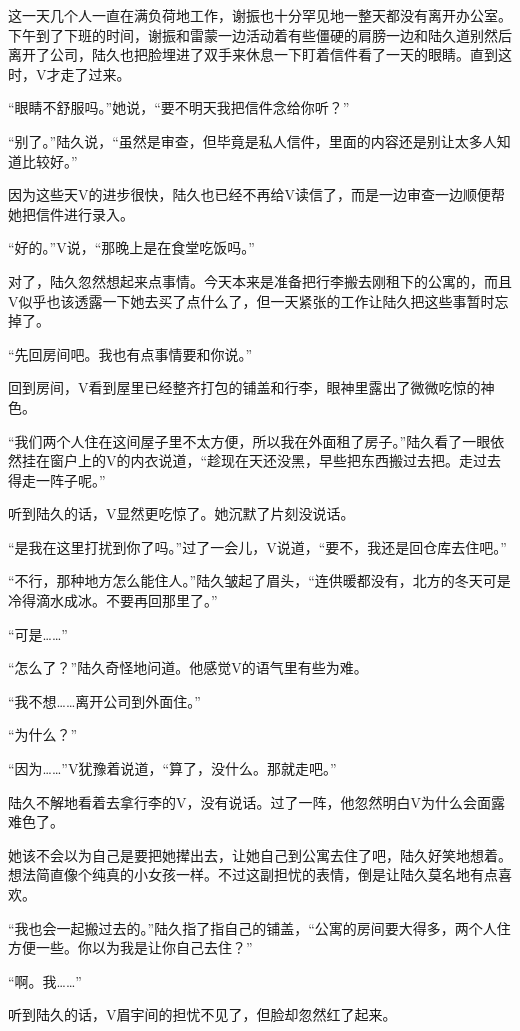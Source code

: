 这一天几个人一直在满负荷地工作，谢振也十分罕见地一整天都没有离开办公室。下午到了下班的时间，谢振和雷蒙一边活动着有些僵硬的肩膀一边和陆久道别然后离开了公司，陆久也把脸埋进了双手来休息一下盯着信件看了一天的眼睛。直到这时，V才走了过来。

“眼睛不舒服吗。”她说，“要不明天我把信件念给你听？”

“别了。”陆久说，“虽然是审查，但毕竟是私人信件，里面的内容还是别让太多人知道比较好。”

因为这些天V的进步很快，陆久也已经不再给V读信了，而是一边审查一边顺便帮她把信件进行录入。

“好的。”V说，“那晚上是在食堂吃饭吗。”

对了，陆久忽然想起来点事情。今天本来是准备把行李搬去刚租下的公寓的，而且V似乎也该透露一下她去买了点什么了，但一天紧张的工作让陆久把这些事暂时忘掉了。

“先回房间吧。我也有点事情要和你说。”

回到房间，V看到屋里已经整齐打包的铺盖和行李，眼神里露出了微微吃惊的神色。

“我们两个人住在这间屋子里不太方便，所以我在外面租了房子。”陆久看了一眼依然挂在窗户上的V的内衣说道，“趁现在天还没黑，早些把东西搬过去把。走过去得走一阵子呢。”

听到陆久的话，V显然更吃惊了。她沉默了片刻没说话。

“是我在这里打扰到你了吗。”过了一会儿，V说道，“要不，我还是回仓库去住吧。”

“不行，那种地方怎么能住人。”陆久皱起了眉头，“连供暖都没有，北方的冬天可是冷得滴水成冰。不要再回那里了。”

“可是……”

“怎么了？”陆久奇怪地问道。他感觉V的语气里有些为难。

“我不想……离开公司到外面住。”

“为什么？”

“因为……”V犹豫着说道，“算了，没什么。那就走吧。”

陆久不解地看着去拿行李的V，没有说话。过了一阵，他忽然明白V为什么会面露难色了。

她该不会以为自己是要把她撵出去，让她自己到公寓去住了吧，陆久好笑地想着。想法简直像个纯真的小女孩一样。不过这副担忧的表情，倒是让陆久莫名地有点喜欢。

“我也会一起搬过去的。”陆久指了指自己的铺盖，“公寓的房间要大得多，两个人住方便一些。你以为我是让你自己去住？”

“啊。我……”

听到陆久的话，V眉宇间的担忧不见了，但脸却忽然红了起来。

